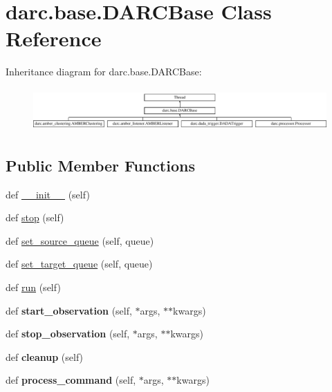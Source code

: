 \hypertarget{classdarc_1_1base_1_1_d_a_r_c_base}{}\section{darc.\+base.\+D\+A\+R\+C\+Base Class Reference}
\label{classdarc_1_1base_1_1_d_a_r_c_base}
Inheritance diagram for darc.\+base.\+D\+A\+R\+C\+Base\+:\begin{figure}[H]
\begin{center}
\leavevmode
\includegraphics[height=1.666667cm]{classdarc_1_1base_1_1_d_a_r_c_base}
\end{center}
\end{figure}
\subsection*{Public Member Functions}
\begin{DoxyCompactItemize}
\item 
def \mbox{\hyperlink{classdarc_1_1base_1_1_d_a_r_c_base_ac14d433a0b0c403939d6a2f8271f56b4}{\+\_\+\+\_\+init\+\_\+\+\_\+}} (self)
\item 
def \mbox{\hyperlink{classdarc_1_1base_1_1_d_a_r_c_base_ab798d069a7ae53fa039a55df6242958c}{stop}} (self)
\item 
def \mbox{\hyperlink{classdarc_1_1base_1_1_d_a_r_c_base_adcf13fe8e114a4c31a9134142426e2d9}{set\+\_\+source\+\_\+queue}} (self, queue)
\item 
def \mbox{\hyperlink{classdarc_1_1base_1_1_d_a_r_c_base_aeaef9ad54544adfbed40e4aae7254b66}{set\+\_\+target\+\_\+queue}} (self, queue)
\item 
def \mbox{\hyperlink{classdarc_1_1base_1_1_d_a_r_c_base_a98ecb06e6f965f6758ce7b084b8c583e}{run}} (self)
\item 
\mbox{\label{classdarc_1_1base_1_1_d_a_r_c_base_a25c94be596d025b74fa83b6a5cd60bb7}} 
def {\bfseries start\+\_\+observation} (self, $\ast$args, $\ast$$\ast$kwargs)
\item 
\mbox{\label{classdarc_1_1base_1_1_d_a_r_c_base_a1132620de6342134a163063da4229c21}} 
def {\bfseries stop\+\_\+observation} (self, $\ast$args, $\ast$$\ast$kwargs)
\item 
\mbox{\label{classdarc_1_1base_1_1_d_a_r_c_base_afae395d3a2e6ae7629a3a3c11dac54d9}} 
def {\bfseries cleanup} (self)
\item 
\mbox{\label{classdarc_1_1base_1_1_d_a_r_c_base_afc58c08e40b36dd46ef93db84ad8ca21}} 
def {\bfseries process\+\_\+command} (self, $\ast$args, $\ast$$\ast$kwargs)
\end{DoxyCompactItemize}
